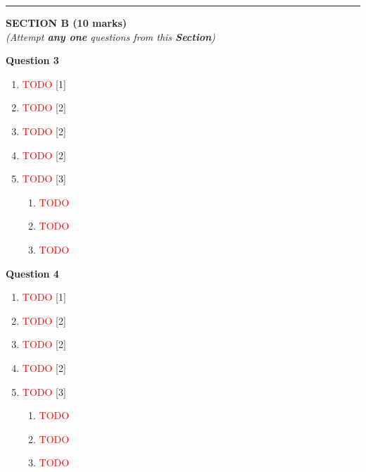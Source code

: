 \par\noindent\rule{\textwidth}{0.4pt}
\begin{center}
   \large
   \textbf{SECTION B (10 marks)}\\
   \vspace{5mm}
   \normalsize
   \textit{(Attempt \textbf{any one} questions from this \textbf{Section})}
\end{center}
\par

\noindent
\textbf{Question 3}
\begin{enumerate}[label=(\alph*)]
    \item \textcolor{red}{TODO} \hfill[1]
    \item \textcolor{red}{TODO} \hfill[2]
    \item \textcolor{red}{TODO} \hfill[2]
    \item \textcolor{red}{TODO} \hfill[2]
    \item \textcolor{red}{TODO} \hfill[3]
        \begin{enumerate}[label=(\roman*)]
        \item \textcolor{red}{TODO}
        \item \textcolor{red}{TODO}
        \item \textcolor{red}{TODO}
        \end{enumerate}
\end{enumerate}

\noindent
\textbf{Question 4}
\item 
\begin{enumerate}[label=(\alph*)]
    \item \textcolor{red}{TODO} \hfill[1]
    \item \textcolor{red}{TODO} \hfill[2]
    \item \textcolor{red}{TODO} \hfill[2]
    \item \textcolor{red}{TODO} \hfill[2]
    \item \textcolor{red}{TODO} \hfill[3]
        \begin{enumerate}[label=(\roman*)]
        \item \textcolor{red}{TODO}
        \item \textcolor{red}{TODO}
        \item \textcolor{red}{TODO}
        \end{enumerate}
\end{enumerate}

